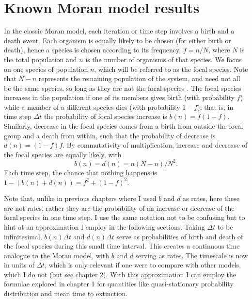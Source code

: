 \section{Known Moran model results}
In the classic Moran model, each iteration or time step involves a birth and a death event.
Each organism is equally likely to be chosen (for either birth or death), hence a species is chosen according to its frequency, $f=n/N$, where $N$ is the total population and $n$ is the number of organisms of that species. 
We focus on one species of population $n$, which will be referred to as the focal species. 
Note that $N-n$ represents the remaining population of the system, and need not all be the same species, so long as they are not the focal species \cite{Black2012}. %
The focal species increases in the population if one of its members gives birth (with probability $f$) while a member of a different species dies (with probability $1-f$); that is, in time step $\Delta t$ the probability of focal species increase is $b(n) = f(1-f)$. 
Similarly, decrease in the focal species comes from a birth from outside the focal group and a death from within, such that the probability of decrease is $d(n) = (1-f)f$. 
By commutativity of multiplication, increase and decrease of the focal species are equally likely, with
\begin{equation}
b(n) = d(n) = n(N-n)/N^2.
\end{equation}
Each time step, the chance that nothing happens is $1-\left(b(n)+d(n)\right) = f^2 + (1-f)^2$. 

Note that, unlike in previous chapters where I used $b$ and $d$ as rates, here these are not rates, rather they are the probability of an increase or decrease of the focal species in one time step. 
I use the same notation not to be confusing but to hint at an approximation I employ in the following sections. %
Taking $\Delta t$ to be infinitesimal, $b(n)\Delta t$ and $d(n)\Delta t$ serve as probabilities of birth and death of the focal species during this small time interval. 
This creates a continuous time analogue to the Moran model, with $b$ and $d$ serving as rates. 
The timescale is now in units of $\Delta t$, which is only relevant if one were to compare with other models, which I do not (but see chapter 2). %
With this approximation I can employ the formulae explored in chapter 1 for quantities like quasi-stationary probability distribution and mean time to extinction. 

